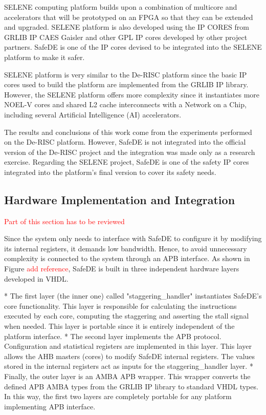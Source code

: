 SELENE computing platform builds upon a combination of multicore and accelerators that will be prototyped on an FPGA so that they can be extended and upgraded. SELENE platform is also developed using the IP CORES from GRLIB IP CAES Gaisler and other GPL IP cores developed by other project partners. SafeDE is one of the IP cores devised to be integrated into the SELENE platform to make it safer.

SELENE platform is very similar to the De-RISC platform since the basic IP cores used to build the platform are implemented from the GRLIB IP library. However, the SELENE platform offers more complexity since it instantiates more NOEL-V cores and shared L2 cache interconnects with a Network on a Chip, including several Artificial Intelligence (AI) accelerators.

The results and conclusions of this work come from the experiments performed on the De-RISC platform. However, SafeDE is not integrated into the official version of the De-RISC project and the integration was made only as a research exercise. Regarding the SELENE project, SafeDE is one of the safety IP cores integrated into the platform's final version to cover its safety needs.
\bigskip

\subsection{Hardware Implementation and Integration}

\textcolor{red}{Part of this section has to be reviewed}

Since the system only needs to interface with SafeDE to configure it by modifying its internal registers, it demands low bandwidth. Hence, to avoid unnecessary complexity is connected to the system through an APB interface. As shown in Figure \textcolor{red}{add reference}, SafeDE is built in three independent hardware layers developed in VHDL. 

* The first layer (the inner one) called "staggering\_handler" instantiates SafeDE's core functionality. This layer is responsible for calculating the instructions executed by each core, computing the staggering and asserting the stall signal when needed. This layer is portable since it is entirely independent of the platform interface. 
* The second layer implements the APB protocol. Configuration and statistical registers are implemented in this layer. This layer allows the AHB masters (cores) to modify SafeDE internal registers. The values stored in the internal registers act as inputs for the staggering\_handler layer.
* Finally, the outer layer is an AMBA APB wrapper. This wrapper converts the defined APB AMBA types from the GRLIB IP library to standard VHDL types. In this way, the first two layers are completely portable for any platform implementing APB interface.

